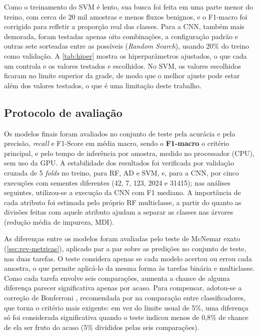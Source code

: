 \documentclass[alpha-refs,brazilian]{CC-EC_TF-TC}
\begin{document}
Como o treinamento do SVM é lento, sua busca foi feita em uma parte menor do treino, com cerca de 20 mil amostras e menos fluxos benignos, e o F1-macro foi corrigido para refletir a proporção real das classes. Para a CNN, também mais demorada, foram testadas apenas oito combinações, a configuração padrão e outras sete sorteadas entre as possíveis (\textit{Random Search}), usando 20\% do treino como validação. A \autoref{tab:hiper} mostra os hiperparâmetros ajustados, o que cada um controla e os valores testados e escolhidos. No SVM, os valores escolhidos ficaram no limite superior da grade, de modo que o melhor ajuste pode estar além dos valores testados, o que é uma limitação deste trabalho.

\subsection{Protocolo de avaliação}
\label{sec:avaliacao}

Os modelos finais foram avaliados no conjunto de teste pela acurácia e pela precisão, \textit{recall} e F1-Score em média macro, sendo o \textbf{F1-macro} o critério principal, e pelo tempo de inferência por amostra, medido no processador (CPU), sem uso da GPU. A estabilidade dos resultados foi verificada por validação cruzada de 5 \textit{folds} no treino, para RF, AD e SVM, e, para a CNN, por cinco execuções com sementes diferentes (42, 7, 123, 2024 e 31415); nas análises seguintes, utilizou-se a execução da CNN com F1 mediano. A importância de cada atributo foi estimada pelo próprio RF multiclasse, a partir do quanto as divisões feitas com aquele atributo ajudam a separar as classes nas árvores (redução média de impureza, MDI).

As diferenças entre os modelos foram avaliadas pelo teste de McNemar exato (\autoref{sec:rev-metricas}), aplicado par a par sobre as predições no conjunto de teste, nas duas tarefas. O teste considera apenas se cada modelo acertou ou errou cada amostra, o que permite aplicá-lo da mesma forma às tarefas binária e multiclasse. Como cada tarefa envolve seis comparações, aumenta a chance de alguma diferença parecer significativa apenas por acaso. Para compensar, adotou-se a correção de Bonferroni \citep{dunn1961multiple}, recomendada por \citet{salzberg1997comparing} na comparação entre classificadores, que torna o critério mais exigente: em vez do limite usual de 5\%, uma diferença só foi considerada significativa quando o teste indicou menos de 0,8\% de chance de ela ser fruto do acaso (5\% divididos pelas seis comparações).
\end{document}
